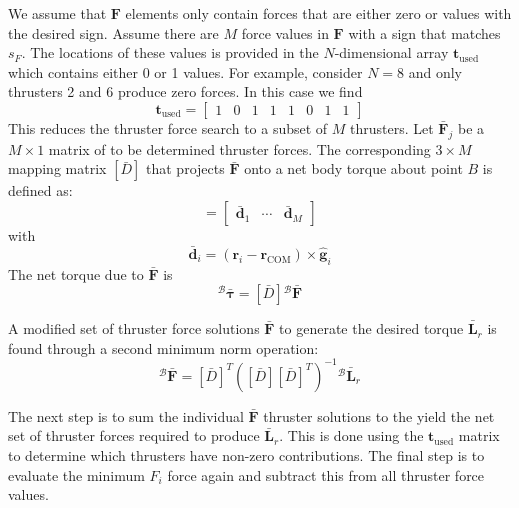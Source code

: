 We assume that $\bm F$ elements only contain forces that are either zero or values with the desired sign.   Assume there are $M$  force values in $\bm F$ with a sign that matches $s_{F}$.  The locations of these values is provided in the $N$-dimensional array $\bm t_{\text{used}}$ which contains either 0 or 1 values.  For example, consider $N=8$ and only thrusters 2 and 6 produce  zero forces. In this case we find
\begin{equation}
	\bm t_{\text{used}} = \begin{bmatrix}
		1 & 0 & 1 & 1 & 1 & 0 & 1 & 1
	\end{bmatrix}
\end{equation}
This reduces the thruster force search to a subset of $M$ thrusters.  Let $\bar{\bm F}_{j}$ be a $M\times 1$ matrix of to be determined thruster forces.  The corresponding $3\times M$ mapping matrix $[\bar D]$ that projects $\bar{\bm F}$ onto a net body torque about point $B$ is defined as:
\begin{equation}
	[\bar D] = \begin{bmatrix} \bar{\bm d}_{1} & \cdots & \bar{\bm d}_{M} \end{bmatrix}
\end{equation}
with
\begin{equation}
	\bar{\bm d}_{i} = (\bm r_{i} - \bm r_{\text{COM}}) \times \hat{\bm g}_{i}
\end{equation}
The net torque due to $\bar{\bm F}$ is 
\begin{equation}
	{}^{\mathcal{B}}\bar{\bm \tau} = [\bar D] {}^{\mathcal{B}}\bar{\bm F}
\end{equation}

A modified set of thruster force solutions $\bar{\bm F}$ to generate the desired torque $\bar{\bm L}_{r}$ is found through a second minimum norm operation:
\begin{equation}
	\label{eq:th:min2}
	{}^{\mathcal{B}}\bar{\bm F} = [\bar D]^{T}([\bar D][\bar D]^{T})^{-1} {}^{\mathcal{B}}\bar{\bm L}_{r}
\end{equation}




The next step is to sum the individual $\bar{\bm F}$ thruster solutions to the yield the net set of thruster forces required to produce $\bar{\bm L}_{r}$.  This is done using the  $\bm t_{\text{used}}$ matrix to determine which thrusters have non-zero contributions.   The final step is to evaluate the minimum $F_{i}$ force again and subtract this from all thruster force values.




